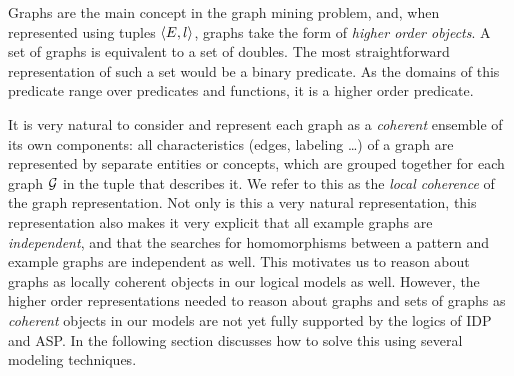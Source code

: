 Graphs are the main concept in the graph mining problem, and, when represented using  tuples $\langle E,l \rangle$, graphs take the form of \emph{higher order objects}.
A set of graphs is equivalent to a set of doubles.
The most straightforward representation of such a set would be a binary predicate.
As the domains of this predicate range over predicates and functions, it is a higher order predicate.

It is very natural to consider and represent each graph as a \emph{coherent} ensemble of its own components: all characteristics (edges, labeling \ldots) of a graph are represented by separate entities or concepts, which are grouped together for each graph $\mathcal{G}$ in the tuple that describes it. We refer to this as the \emph{local coherence} of the graph representation.
Not only is this a very natural representation, this representation also makes it very explicit that all example graphs are \emph{independent}, and that the searches for homomorphisms between a pattern and example graphs are independent as well.
This motivates us to reason about graphs as locally coherent objects in our logical models as well.
However, the higher order representations needed to reason about graphs and sets of graphs as \emph{coherent} objects in our models are not yet fully supported by the logics of IDP and ASP.
In the following section discusses how to solve this using several modeling techniques.




